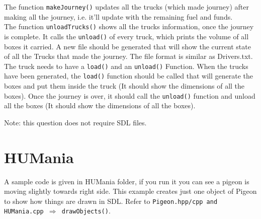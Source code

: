 \documentclass[a4paper,12pt]{article}
\begin{document}
	\noindent The function \texttt{makeJourney()} updates all the trucks (which made journey) after making all the journey, i.e. it'll update with the remaining fuel and funds.\\
	
	\noindent The function \texttt{unloadTrucks()} shows all the trucks information, once the journey is complete. It calls the \texttt{unload()} of every truck, which prints the volume of all boxes it carried. A new file  should be generated that will show the current state of all the Trucks that made the journey. The file format is similar as Drivers.txt.\smallskip\\	

	
	
	\noindent The truck needs to have a \texttt{load()} and an \texttt{unload()} Function. When the trucks have been generated, the \texttt{load()} function should be called that will generate the boxes and put them inside the truck (It should show the dimensions of all the boxes). Once the journey is over, it should call the \texttt{unload()} function and unload all the boxes (It should show the dimensions of all the boxes).
	
	Note: this question does not require SDL files.
	
	\section{HUMania}
	
	A sample code is given in HUMania folder, if you run it you can see a pigeon is moving slightly towards right side. This example creates just one object of Pigeon to show how things are drawn in SDL. Refer to \texttt{Pigeon.hpp/cpp and HUMania.cpp $ \Rightarrow $ drawObjects()}.
	
\end{document}
